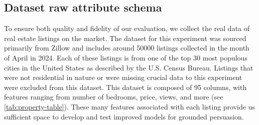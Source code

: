 \subsection{Dataset raw attribute schema}
To ensure both quality and fidelity of our evaluation, we collect the real data of real estate listings on the market. The dataset for this experiment was sourced primarily from Zillow and includes around 50000 listings collected in the month of April in 2024. Each of these listings is from one of the top 30 most populous cities in the United States as described by the U.S. Census Bureau. Listings that were not residential in nature or were missing crucial data to this experiment were excluded from this dataset. This dataset is composed of 95 columns, with features ranging from number of bedrooms, price, views, and more (see \cref{tab:property-table}). These many features associated with each listing provide us sufficient space to develop and test improved models for grounded persuasion.

